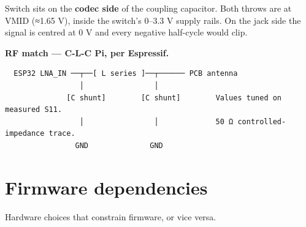 \documentclass[11pt]{article}
\begin{document}
Switch sits on the \textbf{codec side} of the coupling capacitor. Both throws are at VMID (≈1.65 V),
inside the switch's 0–3.3 V supply rails. On the jack side the signal is centred at 0 V and every
negative half-cycle would clip.

\textbf{RF match — C-L-C Pi, per Espressif.}

\begin{Verbatim}
  ESP32 LNA_IN ──┬──[ L series ]──┬────── PCB antenna
                 │                │
              [C shunt]        [C shunt]        Values tuned on measured S11.
                 │                │             50 Ω controlled-impedance trace.
                GND              GND
\end{Verbatim}

\section{Firmware dependencies}

Hardware choices that constrain firmware, or vice versa.
\end{document}

